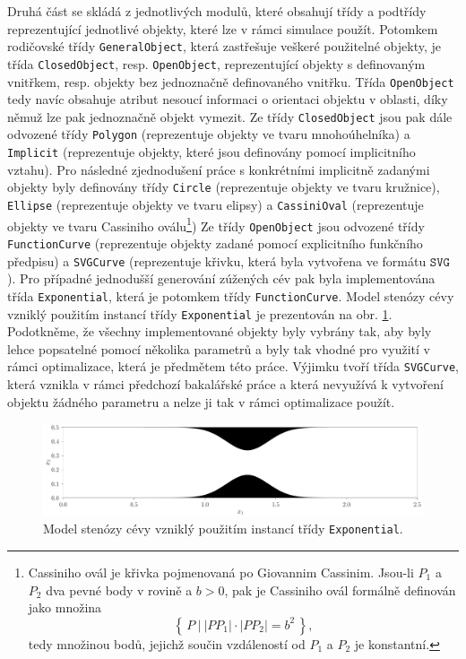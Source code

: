 Druhá část se skládá z jednotlivých modulů, které obsahují třídy a podtřídy reprezentující jednotlivé objekty, které lze v rámci simulace použít. Potomkem rodičovské třídy \texttt{GeneralObject}, která zastřešuje veškeré použitelné objekty, je třída \texttt{ClosedObject}, resp. \texttt{OpenObject},  reprezentující objekty s definovaným vnitřkem, resp. objekty bez jednoznačně definovaného vnitřku. Třída \texttt{OpenObject} tedy navíc obsahuje atribut nesoucí informaci o orientaci objektu v oblasti, díky němuž lze pak jednoznačně objekt vymezit. Ze třídy \texttt{ClosedObject} jsou pak dále odvozené třídy \texttt{Polygon} (reprezentuje objekty ve tvaru mnohoúhelníka) a \texttt{Implicit} (reprezentuje objekty, které jsou definovány pomocí implicitního vztahu). Pro následné zjednodušení práce s konkrétními implicitně zadanými objekty byly definovány třídy \texttt{Circle} (reprezentuje objekty ve tvaru kružnice), \texttt{Ellipse} (reprezentuje objekty ve tvaru elipsy) a \texttt{CassiniOval} (reprezentuje objekty ve tvaru Cassiniho oválu\footnote{Cassiniho ovál je křivka pojmenovaná po Giovannim Cassinim. Jsou-li $ P_1 $ a $ P_2 $ dva pevné body v rovině a $ b > 0$, pak je Cassiniho ovál formálně definován jako množina $$ \left\{ \, P \: \big| \: |PP_1|\cdot|PP_2| = b^2 \, \right\} ,$$ tedy množinou bodů, jejichž součin vzdáleností od $ P_1 $ a $ P_2 $ je konstantní.}) Ze třídy \texttt{OpenObject} jsou odvozené třídy \texttt{FunctionCurve} (reprezentuje objekty zadané pomocí explicitního funkčního předpisu) a \texttt{SVGCurve} (reprezentuje křivku, která byla vytvořena ve formátu $\mathtt{SVG} $ \cite{Eisenberg2002}). Pro případné jednodušší generování zúžených cév pak byla implementována třída \texttt{Exponential}, která je potomkem třídy \texttt{FunctionCurve}. Model stenózy cévy vzniklý použitím instancí třídy \texttt{Exponential} je prezentován na obr. \ref{fig:vessel exponential}. Podotkněme, že všechny implementované objekty byly vybrány tak, aby byly lehce popsatelné pomocí několika parametrů a byly tak vhodné pro využití v rámci optimalizace, která je předmětem této práce. Výjimku tvoří třída \texttt{SVGCurve}, která vznikla v rámci předchozí bakalářské práce a která nevyužívá k vytvoření objektu žádného parametru a nelze ji tak v rámci optimalizace použít.


\begin{figure}[h]
	\centering
	\vspace{8mm}
	\includegraphics[width=0.95	\textwidth]{Images/figvessel.pdf}
	\vspace{2mm}
	\caption{Model stenózy cévy vzniklý použitím instancí třídy \texttt{Exponential}.}
	
	\label{fig:vessel exponential}
	\vspace{1.8mm}
\end{figure}

